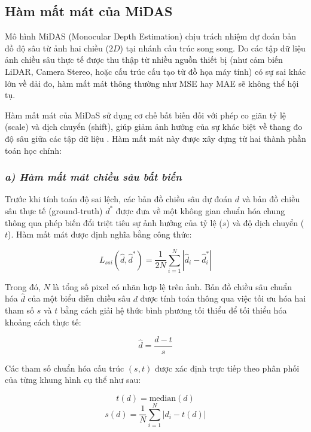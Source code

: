 \subsection{Hàm mất mát của MiDAS}
Mô hình MiDAS (Monocular Depth Estimation) chịu trách nhiệm dự đoán bản đồ độ sâu từ ảnh hai chiều ($2D$) tại nhánh cấu trúc song song. Do các tập dữ liệu ảnh chiều sâu thực tế được thu thập từ nhiều nguồn thiết bị (như cảm biến LiDAR, Camera Stereo, hoặc cấu trúc cấu tạo từ đồ họa máy tính) có sự sai khác lớn về dải đo, hàm mất mát thông thường như MSE hay MAE sẽ không thể hội tụ. 

Hàm mất mát của MiDaS sử dụng cơ chế bất biến đối với phép co giãn tỷ lệ (scale) và dịch chuyển (shift), giúp giảm ảnh hưởng của sự khác biệt về thang đo độ sâu giữa các tập dữ liệu \cite{Reference11}. Hàm mất mát này được xây dựng từ hai thành phần toán học chính:

\subsubsection*{\textit{a) Hàm mất mát chiều sâu bất biến}}
Trước khi tính toán độ sai lệch, các bản đồ chiều sâu dự đoán $d$ và bản đồ chiều sâu thực tế (ground-truth) $d^*$ được đưa về một không gian chuẩn hóa chung thông qua phép biến đổi triệt tiêu sự ảnh hưởng của tỷ lệ ($s$) và độ dịch chuyển ($t$). Hàm mất mát được định nghĩa bằng công thức:

\begin{equation}
    L_{ssi}(\hat{d}, \hat{d}^*) = \frac{1}{2N} \sum_{i=1}^{N} \left| \hat{d}_i - \hat{d}^*_i \right|
\end{equation}

Trong đó, $N$ là tổng số pixel có nhãn hợp lệ trên ảnh. Bản đồ chiều sâu chuẩn hóa $\hat{d}$ của một biểu diễn chiều sâu $d$ được tính toán thông qua việc tối ưu hóa hai tham số $s$ và $t$ bằng cách giải hệ thức bình phương tối thiểu để tối thiểu hóa khoảng cách thực tế:

\begin{equation}
    \hat{d} = \frac{d - t}{s}
\end{equation}

Các tham số chuẩn hóa cấu trúc $(s, t)$ được xác định trực tiếp theo phân phối của từng khung hình cụ thể như sau:

\begin{equation}
    t(d) = \text{median}(d)
\end{equation}
\begin{equation}
    s(d) = \frac{1}{N} \sum_{i=1}^{N} \left| d_i - t(d) \right|
\end{equation}

